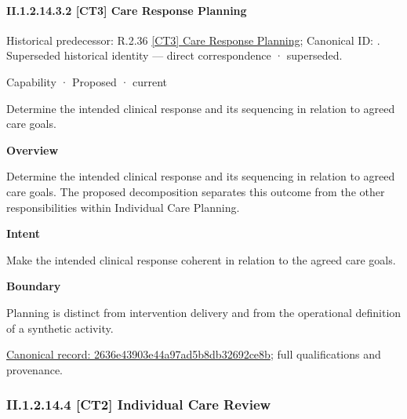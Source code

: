 \paragraph*{II.1.2.14.3.2 [CT3] Care Response Planning}
\label{navigation:II.1.2.14.3.2}

{\small Historical predecessor: R.2.36 \hyperref[element:d64569acaf2c44f3b2a5332f74fff7c7]{[CT3] Care Response Planning}; Canonical ID: \texttt{}. Superseded historical identity — direct correspondence · superseded.}\par
\label{element:2636e43903e44a97ad5b8db32692ce8b}
{\small Capability · Proposed · current}\par

Determine the intended clinical response and its sequencing in relation to agreed care goals.



\textbf{Overview}



Determine the intended clinical response and its sequencing in relation to agreed care goals. The proposed decomposition separates this outcome from the other responsibilities within Individual Care Planning.



\textbf{Intent}



Make the intended clinical response coherent in relation to the agreed care goals.



\textbf{Boundary}



Planning is distinct from intervention delivery and from the operational definition of a synthetic activity.


{\footnotesize \href{../../../../continuum/strategy/capability/2636e43903e44a97ad5b8db32692ce8b.md}{Canonical record: 2636e43903e44a97ad5b8db32692ce8b}; full qualifications and provenance.}\par
\subsubsection*{II.1.2.14.4 [CT2] Individual Care Review}
\label{navigation:II.1.2.14.4}

